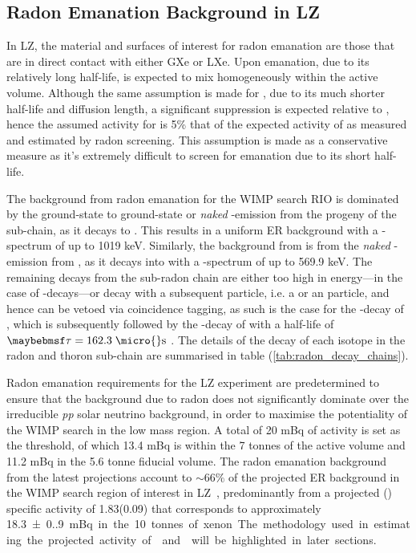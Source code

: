 \subsection{Radon Emanation Background in LZ}
\label{secsec:radon_in_lz}

In LZ, the material and surfaces of interest for radon emanation are those that are in direct contact with either GXe or LXe. Upon emanation, due to its relatively long half-life, \RnTTT{} is expected to mix homogeneously within the active volume. Although the same assumption is made for \RnTTZ{}, due to its much shorter half-life and diffusion length, a significant suppression is expected relative to \RnTTT{}, hence the assumed activity for \RnTTZ{} is 5\% that of the expected activity of \RnTTT{} as measured and estimated by radon screening. This assumption is made as a conservative measure as it's extremely difficult to screen for \RnTTZ{} emanation due to its short half-life.

The background from radon emanation for the WIMP search RIO is dominated by the ground-state to ground-state or \textit{naked} \beta-emission from the \PbTOF{} progeny of the \RnTTT{} sub-chain, as it decays to \BiTOF. This results in a uniform ER background with a \beta-spectrum of up to 1019 keV. Similarly, the background from \RnTTZ{} is from the \textit{naked} \beta-emission from \PbTOT{}, as it decays into \BiTOT{} with a \beta-spectrum of up to 569.9 keV. The remaining decays from the sub-radon chain are either too high in energy---in the case of \alpha-decays---or decay with a subsequent particle, i.e. a \gray{} or an \alpha particle, and hence can be vetoed via coincidence tagging, as such is the case for the \beta-decay of \BiTOF{}, which is subsequently followed by the \alpha-decay of \PbTOF{} with a half-life of $\tau{} = 162.3 \; \MathText{\micro{}s}$ \cite{radiogenic_muon_lux,Araujo:2011as}. The details of the decay of each isotope in the radon and thoron sub-chain are summarised in table (\ref{tab:radon_decay_chains}).

Radon emanation requirements for the LZ experiment are predetermined to ensure that the background due to radon does not significantly dominate over the irreducible \textit{pp} solar neutrino background, in order to maximise the potentiality of the WIMP search in the low mass region. A total of 20 mBq of \RnTTT{} activity is set as the threshold, of which 13.4 mBq is within the 7 tonnes of the active volume and 11.2 mBq in the 5.6 tonne fiducial volume. The radon emanation background from the latest projections account to $\sim66\%$ of the projected ER background in the WIMP search region of interest in LZ~\cite{akerib2018projected}, predominantly from a projected \RnTTT{}(\RnTTZ{}) specific activity of 1.83(0.09) {\micro\becquerel\per\kilogram} that corresponds to approximately \SI{18.3(0.9)} mBq in the 10 tonnes of xenon. The methodology used in estimating the projected activity of \RnTTT{} and \RnTTZ{} will be highlighted in later sections. 

